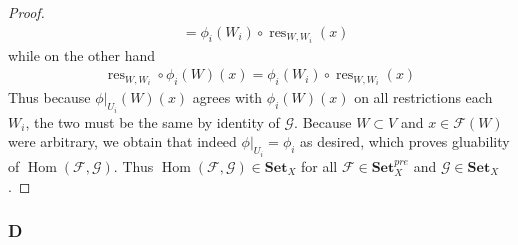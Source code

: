 \documentclass{article}
\newcommand{\fF}{\mathscr{F}}
\newcommand{\fG}{\mathscr{G}}
\DeclareMathOperator{\res}{res}
\DeclareMathOperator{\Hom}{Hom}
\newcommand{\Set}{\mathbf{Set}} %
\begin{document}
\begin{proof}
\begin{align*}
        &= \phi_i(W_i)\circ \res_{W,W_i}(x)
    \end{align*}
    while on the other hand
    \begin{align*}
        \res_{W,W_i}\circ \phi_i(W)(x)=\phi_i(W_i)\circ \res_{W,W_i}(x)
    \end{align*}
    Thus because $\phi\vert_{U_i}(W)(x)$ agrees with $\phi_i(W)(x)$ on all restrictions each $W_i$, the two must be the same by identity of $\fG$. Because $W\subset V$ and $x\in \fF(W)$ were arbitrary, we obtain that indeed $\phi\vert_{U_i}=\phi_i$ as desired, which proves gluability of $\Hom(\fF,\fG)$. Thus $\Hom(\fF,\fG)\in \Set_X$ for all $\fF\in \Set_X^{pre}$ and $\fG\in \Set_X$.
\end{proof}
\subsubsection{D}\label{2.3.D}
\end{document}
